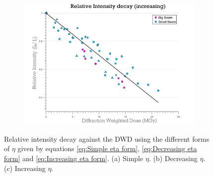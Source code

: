 \begin{figure}
\ContinuedFloat
    \begin{subfigure}[b]{1\textwidth}
        \centering
        \includegraphics[width=\textwidth]{figures/dwd/reproduce_relint_DWDnew.pdf}
        \caption{}
        \label{fig:Relative intensity - Decreasing Eta}
    \end{subfigure}
	\caption[Relative intensity plots comparing DWD with different $\eta$ forms.]{Relative intensity decay against the DWD using the different forms of $\eta$ given by equations \ref{eq:Simple eta form}, \ref{eq:Decreasing eta form} and \ref{eq:Increasing eta form}.
    (a) Simple $\eta$.
    (b) Decreasing $\eta$.
    (c) Increasing $\eta$.}
	\label{fig:Relative intensity - DWD eta forms}
\end{figure}

